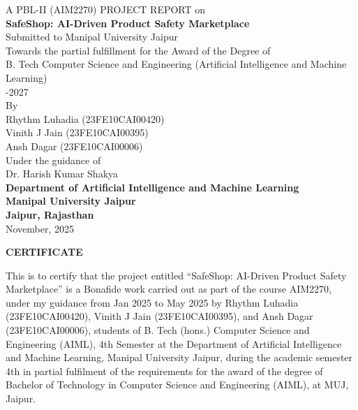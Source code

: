 \documentclass[12pt,a4paper]{report}
\begin{document}
\pagestyle{empty}

\begin{titlepage}
\begin{center}
{\fontsize{12}{14}\selectfont A PBL-II (AIM2270) PROJECT REPORT on}\\[0.5cm]
{\fontsize{24}{28}\bfseries SafeShop: AI-Driven Product Safety Marketplace}\\[1.5cm]

{\fontsize{12}{14}\selectfont Submitted to Manipal University Jaipur}\\
{\fontsize{12}{14}\selectfont Towards the partial fulfillment for the Award of the Degree of}\\[0.5cm]
{\fontsize{14}{16}\selectfont B. Tech Computer Science and Engineering (Artificial Intelligence and Machine Learning)}\\[0.5cm]
{\fontsize{12}{14}-2027}\\[1.5cm]

{\fontsize{12}{14}\selectfont By}\\[0.5cm]
{\fontsize{14}{16}\selectfont Rhythm Luhadia (23FE10CAI00420)}\\
{\fontsize{14}{16}\selectfont Vinith J Jain (23FE10CAI00395)}\\
{\fontsize{14}{16}\selectfont Ansh Dagar (23FE10CAI00006)}\\[2cm]

{\fontsize{12}{14}\selectfont Under the guidance of}\\
{\fontsize{14}{16}\selectfont Dr. Harish Kumar Shakya}\\[1.5cm]

{\fontsize{16}{19}\bfseries Department of Artificial Intelligence and Machine Learning\\
Manipal University Jaipur\\
Jaipur, Rajasthan}\\[1cm]
{\fontsize{12}{14}\selectfont November, 2025}
\end{center}
\end{titlepage}

\newpage
\begin{center}
{\fontsize{14}{16}\bfseries CERTIFICATE}
\end{center}
\vspace{1cm}
This is to certify that the project entitled ``SafeShop: AI-Driven Product Safety Marketplace'' is a Bonafide work carried out as part of the course AIM2270, under my guidance from Jan 2025 to May 2025 by Rhythm Luhadia (23FE10CAI00420), Vinith J Jain (23FE10CAI00395), and Ansh Dagar (23FE10CAI00006), students of B. Tech (hons.) Computer Science and Engineering (AIML), 4th Semester at the Department of Artificial Intelligence and Machine Learning, Manipal University Jaipur, during the academic semester 4th in partial fulfilment of the requirements for the award of the degree of Bachelor of Technology in Computer Science and Engineering (AIML), at MUJ, Jaipur.
\end{document}
